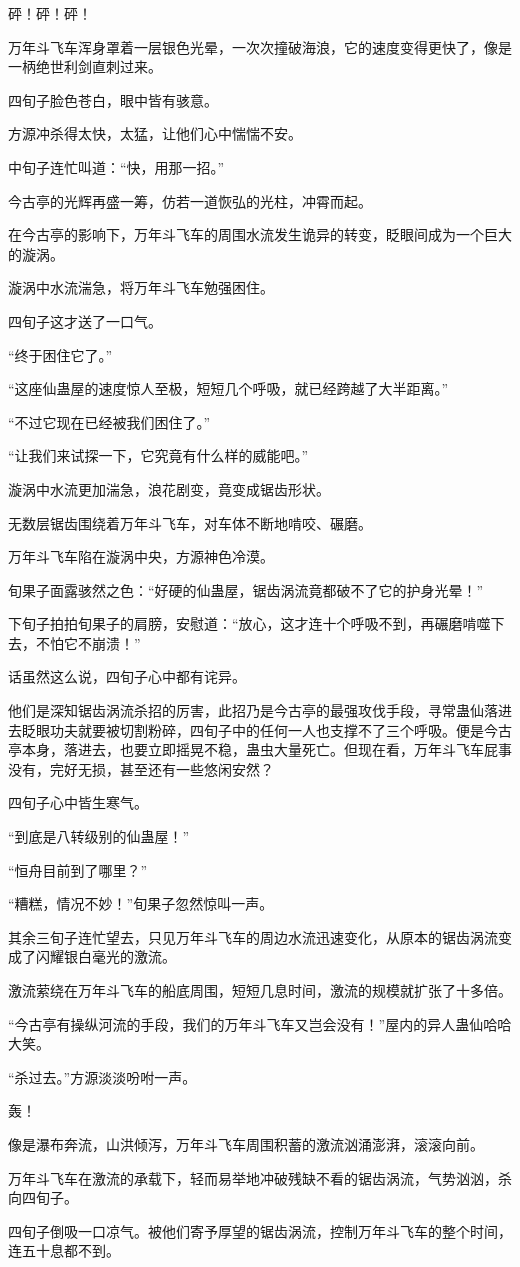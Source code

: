 \begin{this_body}
砰！砰！砰！

万年斗飞车浑身罩着一层银色光晕，一次次撞破海浪，它的速度变得更快了，像是一柄绝世利剑直刺过来。

四旬子脸色苍白，眼中皆有骇意。

方源冲杀得太快，太猛，让他们心中惴惴不安。

中旬子连忙叫道：“快，用那一招。”

今古亭的光辉再盛一筹，仿若一道恢弘的光柱，冲霄而起。

在今古亭的影响下，万年斗飞车的周围水流发生诡异的转变，眨眼间成为一个巨大的漩涡。

漩涡中水流湍急，将万年斗飞车勉强困住。

四旬子这才送了一口气。

“终于困住它了。”

“这座仙蛊屋的速度惊人至极，短短几个呼吸，就已经跨越了大半距离。”

“不过它现在已经被我们困住了。”

“让我们来试探一下，它究竟有什么样的威能吧。”

漩涡中水流更加湍急，浪花剧变，竟变成锯齿形状。

无数层锯齿围绕着万年斗飞车，对车体不断地啃咬、碾磨。

万年斗飞车陷在漩涡中央，方源神色冷漠。

旬果子面露骇然之色：“好硬的仙蛊屋，锯齿涡流竟都破不了它的护身光晕！”

下旬子拍拍旬果子的肩膀，安慰道：“放心，这才连十个呼吸不到，再碾磨啃噬下去，不怕它不崩溃！”

话虽然这么说，四旬子心中都有诧异。

他们是深知锯齿涡流杀招的厉害，此招乃是今古亭的最强攻伐手段，寻常蛊仙落进去眨眼功夫就要被切割粉碎，四旬子中的任何一人也支撑不了三个呼吸。便是今古亭本身，落进去，也要立即摇晃不稳，蛊虫大量死亡。但现在看，万年斗飞车屁事没有，完好无损，甚至还有一些悠闲安然？

四旬子心中皆生寒气。

“到底是八转级别的仙蛊屋！”

“恒舟目前到了哪里？”

“糟糕，情况不妙！”旬果子忽然惊叫一声。

其余三旬子连忙望去，只见万年斗飞车的周边水流迅速变化，从原本的锯齿涡流变成了闪耀银白毫光的激流。

激流萦绕在万年斗飞车的船底周围，短短几息时间，激流的规模就扩张了十多倍。

“今古亭有操纵河流的手段，我们的万年斗飞车又岂会没有！”屋内的异人蛊仙哈哈大笑。

“杀过去。”方源淡淡吩咐一声。

轰！

像是瀑布奔流，山洪倾泻，万年斗飞车周围积蓄的激流汹涌澎湃，滚滚向前。

万年斗飞车在激流的承载下，轻而易举地冲破残缺不看的锯齿涡流，气势汹汹，杀向四旬子。

四旬子倒吸一口凉气。被他们寄予厚望的锯齿涡流，控制万年斗飞车的整个时间，连五十息都不到。

\end{this_body}

